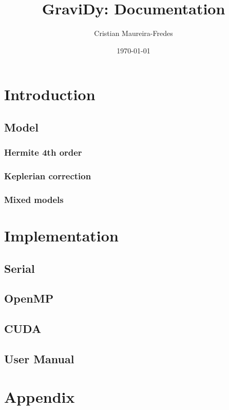 \documentclass[a4paper]{report}
\title{{\sc GraviDy}: Documentation}
\author{Cristian Maureira-Fredes}
\date{\today}
\begin{document}

\chapter{Introduction}
\section{Model}
\subsection{Hermite 4th order}
\subsection{Keplerian correction}

\subsection{Mixed models}


\chapter{Implementation}
\section{Serial}
\section{OpenMP}
\section{CUDA}

\section{User Manual}

\chapter{Appendix}

\end{document}
